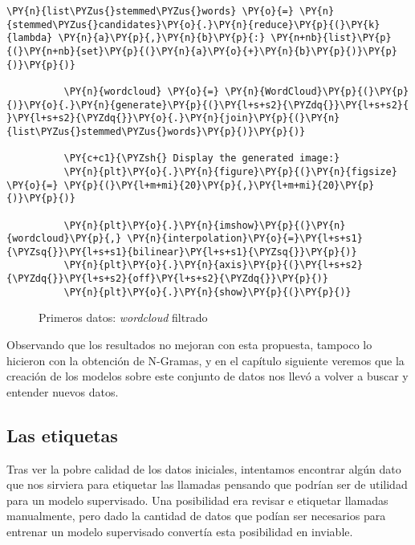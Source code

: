                   
              \begin{tcolorbox}[breakable, size=fbox, boxrule=1pt, pad at break*=1mm,colback=cellbackground, colframe=cellborder]
          \begin{Verbatim}[commandchars=\\\{\}]
          \PY{n}{list\PYZus{}stemmed\PYZus{}words} \PY{o}{=} \PY{n}{stemmed\PYZus{}candidates}\PY{o}{.}\PY{n}{reduce}\PY{p}{(}\PY{k}{lambda} \PY{n}{a}\PY{p}{,}\PY{n}{b}\PY{p}{:} \PY{n+nb}{list}\PY{p}{(}\PY{n+nb}{set}\PY{p}{(}\PY{n}{a}\PY{o}{+}\PY{n}{b}\PY{p}{)}\PY{p}{)}\PY{p}{)}
          
          \PY{n}{wordcloud} \PY{o}{=} \PY{n}{WordCloud}\PY{p}{(}\PY{p}{)}\PY{o}{.}\PY{n}{generate}\PY{p}{(}\PY{l+s+s2}{\PYZdq{}}\PY{l+s+s2}{ }\PY{l+s+s2}{\PYZdq{}}\PY{o}{.}\PY{n}{join}\PY{p}{(}\PY{n}{list\PYZus{}stemmed\PYZus{}words}\PY{p}{)}\PY{p}{)}
          
          \PY{c+c1}{\PYZsh{} Display the generated image:}
          \PY{n}{plt}\PY{o}{.}\PY{n}{figure}\PY{p}{(}\PY{n}{figsize} \PY{o}{=} \PY{p}{(}\PY{l+m+mi}{20}\PY{p}{,}\PY{l+m+mi}{20}\PY{p}{)}\PY{p}{)}
          
          \PY{n}{plt}\PY{o}{.}\PY{n}{imshow}\PY{p}{(}\PY{n}{wordcloud}\PY{p}{,} \PY{n}{interpolation}\PY{o}{=}\PY{l+s+s1}{\PYZsq{}}\PY{l+s+s1}{bilinear}\PY{l+s+s1}{\PYZsq{}}\PY{p}{)}
          \PY{n}{plt}\PY{o}{.}\PY{n}{axis}\PY{p}{(}\PY{l+s+s2}{\PYZdq{}}\PY{l+s+s2}{off}\PY{l+s+s2}{\PYZdq{}}\PY{p}{)}
          \PY{n}{plt}\PY{o}{.}\PY{n}{show}\PY{p}{(}\PY{p}{)}
          \end{Verbatim}
          \end{tcolorbox}
          
     
              
              \begin{figure}[!ht]
              	\centering
                    	\caption{Primeros datos: \textit{wordcloud} filtrado}
                    	\label{fig:wordcloudmalo2}
              \end{figure}
              
              
              
              
 Observando que los resultados no mejoran con esta propuesta, tampoco lo hicieron con la obtención de N-Gramas, y en el capítulo siguiente veremos que la creación de los modelos sobre este conjunto de datos nos llevó a volver a buscar y entender nuevos datos.
 
 
 \subsection{Las etiquetas}
 
 Tras ver la pobre calidad de los datos iniciales, intentamos encontrar algún dato que nos sirviera para etiquetar las llamadas pensando que podrían ser de utilidad para un modelo supervisado. Una posibilidad era revisar e etiquetar llamadas manualmente, pero dado la cantidad de datos que podían ser necesarios para entrenar un modelo supervisado convertía esta posibilidad en inviable. 
 
 
